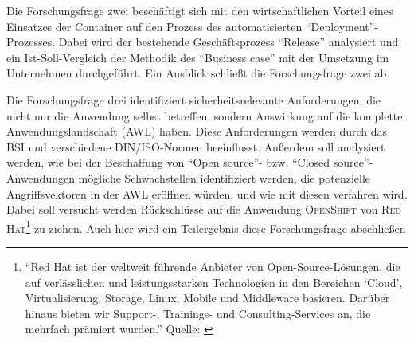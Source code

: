 Die Forschungsfrage zwei beschäftigt sich mit den wirtschaftlichen Vorteil eines Einsatzes der Container auf den Prozess des automatisierten \enquote{Deployment}-Prozesses. Dabei wird der bestehende Geschäftsprozess \enquote{Release} analysiert und ein Ist-Soll-Vergleich der Methodik des \enquote{Business case} mit der Umsetzung im Unternehmen durchgeführt. Ein Ausblick schließt die Forschungsfrage zwei ab. 
\par
Die Forschungsfrage drei identifiziert sicherheitsrelevante Anforderungen, die nicht nur die Anwendung selbst betreffen, sondern Auswirkung auf die komplette Anwendungslandschaft (\acs{AWL}) haben. Diese Anforderungen werden durch das \acl{BSI} und verschiedene \textsc{DIN/ISO}-Normen beeinflusst. Außerdem soll analysiert werden, wie bei der Beschaffung von \enquote{Open source}- bzw. \enquote{Closed source}-Anwendungen mögliche Schwachstellen identifiziert werden, die potenzielle Angriffsvektoren in der \ac{AWL} eröffnen würden, und wie mit diesen verfahren wird. Dabei soll versucht werden Rückschlüsse auf die Anwendung \textsc{OpenShift} von \textsc{Red Hat\footnote{\enquote{Red Hat ist der weltweit führende Anbieter von Open-Source-Lösungen, die auf verlässlichen und leistungsstarken Technologien in den Bereichen \enquote{Cloud}, Virtualisierung, Storage, Linux, Mobile und Middleware basieren. Darüber hinaus bieten wir Support-, Trainings- und Consulting-Services an, die mehrfach prämiert wurden.} Quelle: \cite[][]{red_hat_inc_red_2020}}} zu ziehen. Auch hier wird ein Teilergebnis diese Forschungsfrage abschließen


